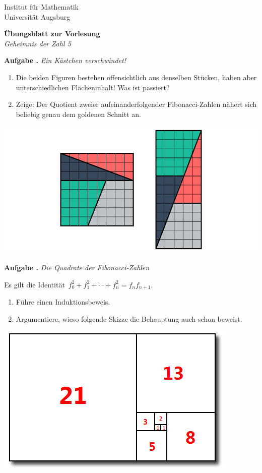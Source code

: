 \documentclass[a4paper,ngerman,twoside]{scrartcl}
\newlength{\aufgabenskip}
\newcounter{aufgabennummer}
\newenvironment{aufgabe}[1]{
  \addtocounter{aufgabennummer}{1}
  \textbf{Aufgabe \theaufgabennummer.} \emph{#1} \par
}{\vspace{\aufgabenskip}}
\begin{document}
\thispagestyle{empty}
Institut für Mathematik \\
Universität Augsburg

\begin{center}
  \textbf{Übungsblatt zur Vorlesung} \\
  \emph{Geheimnis der Zahl 5}
\end{center}
\vspace{1em}

\begin{aufgabe}{Ein Kästchen verschwindet!}
\begin{enumerate}
\item Die beiden Figuren bestehen offensichtlich aus denselben Stücken, haben
aber unterschiedlichen Flächeninhalt! Was ist passiert?
\item Zeige: Der Quotient zweier aufeinanderfolgender Fibonacci-Zahlen nähert
sich beliebig genau dem goldenen Schnitt an.
\end{enumerate}
\begin{center}
  \includegraphics[scale=0.3]{ein-kaestchen-verschwindet}
\end{center}
\end{aufgabe}

\begin{aufgabe}{Die Quadrate der Fibonacci-Zahlen}
Es gilt die Identität~$f_0^2 + f_1^2 + \cdots + f_n^2 = f_n f_{n+1}$.
\begin{enumerate}
\item Führe einen Induktionsbeweis.
\item Argumentiere, wieso folgende Skizze die Behauptung auch schon beweist.
\end{enumerate}
\begin{center}
  \includegraphics[scale=0.3]{fibonacci-quadrate}
\end{center}
\end{aufgabe}
\end{document}

